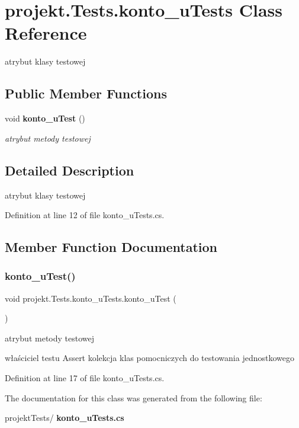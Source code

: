 \section{projekt.\+Tests.\+konto\+\_\+u\+Tests Class Reference}
\label{classprojekt_1_1Tests_1_1konto__uTests}


atrybut klasy testowej  


\subsection*{Public Member Functions}
\begin{DoxyCompactItemize}
\item 
void \textbf{ konto\+\_\+u\+Test} ()
\begin{DoxyCompactList}\small\item\em atrybut metody testowej \end{DoxyCompactList}\end{DoxyCompactItemize}


\subsection{Detailed Description}
atrybut klasy testowej 

Definition at line 12 of file konto\+\_\+u\+Tests.\+cs.



\subsection{Member Function Documentation}
\mbox{\label{classprojekt_1_1Tests_1_1konto__uTests_ad491d7f3814cd065f32ce29087e43e98}} 
\subsubsection{konto\+\_\+u\+Test()}
{\footnotesize\ttfamily void projekt.\+Tests.\+konto\+\_\+u\+Tests.\+konto\+\_\+u\+Test (\begin{DoxyParamCaption}{ }\end{DoxyParamCaption})\hspace{0.3cm}{\ttfamily [inline]}}



atrybut metody testowej 

właściciel testu Assert kolekcja klas pomocniczych do testowania jednostkowego 

Definition at line 17 of file konto\+\_\+u\+Tests.\+cs.



The documentation for this class was generated from the following file\+:\begin{DoxyCompactItemize}
\item 
projekt\+Tests/\textbf{ konto\+\_\+u\+Tests.\+cs}\end{DoxyCompactItemize}
